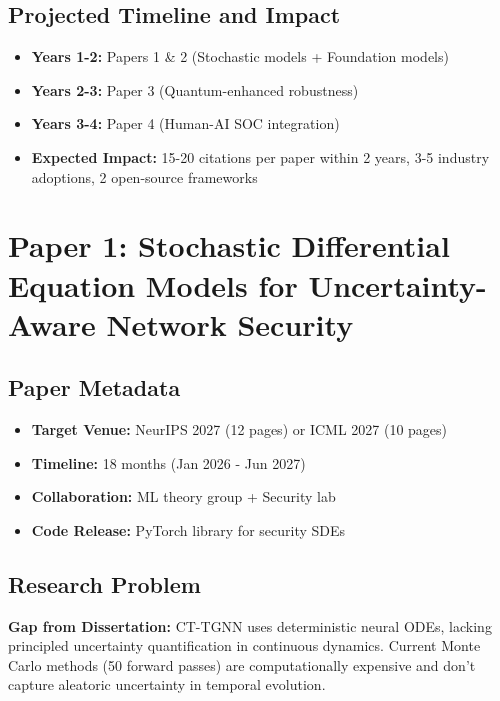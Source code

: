 \documentclass[11pt,letterpaper]{article}
\begin{document}
\subsection{Projected Timeline and Impact}

\begin{itemize}
\item \textbf{Years 1-2:} Papers 1 \& 2 (Stochastic models + Foundation models)
\item \textbf{Years 2-3:} Paper 3 (Quantum-enhanced robustness)
\item \textbf{Years 3-4:} Paper 4 (Human-AI SOC integration)
\item \textbf{Expected Impact:} 15-20 citations per paper within 2 years, 3-5 industry adoptions, 2 open-source frameworks
\end{itemize}

\newpage

\section{Paper 1: Stochastic Differential Equation Models for Uncertainty-Aware Network Security}

\subsection{Paper Metadata}

\begin{itemize}[leftmargin=2em]
\item \textbf{Target Venue:} NeurIPS 2027 (12 pages) or ICML 2027 (10 pages)
\item \textbf{Timeline:} 18 months (Jan 2026 - Jun 2027)
\item \textbf{Collaboration:} ML theory group + Security lab
\item \textbf{Code Release:} PyTorch library for security SDEs
\end{itemize}

\subsection{Research Problem}

\textbf{Gap from Dissertation:} CT-TGNN uses deterministic neural ODEs, lacking principled uncertainty quantification in continuous dynamics. Current Monte Carlo methods (50 forward passes) are computationally expensive and don't capture aleatoric uncertainty in temporal evolution.
\end{document}
